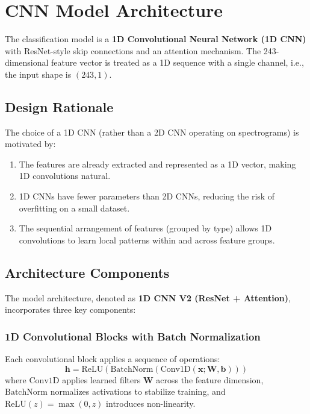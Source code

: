 \documentclass[12pt,a4paper]{report}
\begin{document}
\section{CNN Model Architecture}
\label{sec:cnn_architecture}

The classification model is a \textbf{1D Convolutional Neural Network (1D CNN)} with ResNet-style skip connections and an attention mechanism. The 243-dimensional feature vector is treated as a 1D sequence with a single channel, i.e., the input shape is $(243, 1)$.

\subsection{Design Rationale}

The choice of a 1D CNN (rather than a 2D CNN operating on spectrograms) is motivated by:
\begin{enumerate}
    \item The features are already extracted and represented as a 1D vector, making 1D convolutions natural.
    \item 1D CNNs have fewer parameters than 2D CNNs, reducing the risk of overfitting on a small dataset.
    \item The sequential arrangement of features (grouped by type) allows 1D convolutions to learn local patterns within and across feature groups.
\end{enumerate}

\subsection{Architecture Components}

The model architecture, denoted as \textbf{1D CNN V2 (ResNet + Attention)}, incorporates three key components:

\subsubsection{1D Convolutional Blocks with Batch Normalization}

Each convolutional block applies a sequence of operations:
\begin{equation}
    \mathbf{h} = \text{ReLU}\left(\text{BatchNorm}\left(\text{Conv1D}(\mathbf{x}; \mathbf{W}, \mathbf{b})\right)\right)
\end{equation}
where $\text{Conv1D}$ applies learned filters $\mathbf{W}$ across the feature dimension, $\text{BatchNorm}$ normalizes activations to stabilize training, and $\text{ReLU}(z) = \max(0, z)$ introduces non-linearity.
\end{document}
